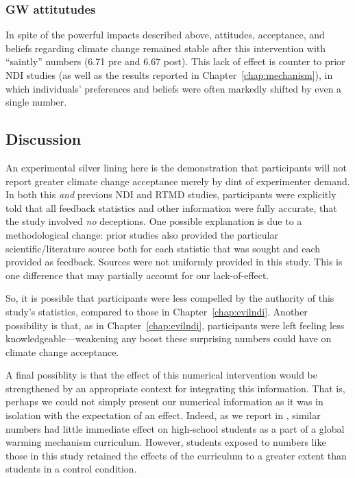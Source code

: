 \subsubsection{GW attitutudes}

In spite of the powerful impacts described above, attitudes, acceptance, and
beliefs regarding climate change remained stable after this intervention with
“saintly” numbers (6.71 pre and 6.67 post).  This lack of effect is counter to
prior NDI studies (as well as the results reported in
Chapter~\ref{chap:mechanism}), in which individuals’ preferences and beliefs
were often markedly shifted by even a single number. 

\subsection{Discussion}


An experimental silver lining here is the demonstration that participants will
not report greater climate change acceptance merely by dint of experimenter
demand.  In both this \emph{and} previous NDI and RTMD studies, participants
were explicitly told that all feedback statistics and other information were
fully accurate, that the study involved \emph{no} deceptions.  One possible
explanation is due to a methodological change: prior studies 
also provided the particular scientific/literature source both
for each statistic that was sought and each provided as feedback.
Sources were not uniformly provided in this study. This is one
difference that may partially account for our lack-of-effect.

So, it is possible that participants were less compelled by the authority of
this study’s statistics, compared to those in Chapter~\ref{chap:evilndi}.
Another possibility is that, as in Chapter~\ref{chap:evilndi}, participants were
left feeling less knowledgeable—weakening any boost these surprising numbers
could have on climate change acceptance.  

A final possiblity is that the effect of this numerical intervention would be
strengthened by an appropriate context for integrating this information. That
is, perhaps we could not simply present our numerical information as it was in
isolation with the expectation of an effect. Indeed, as we report in
\parencite{clark_knowledge_inpress}, similar numbers had little immediate effect on
high-school students as a part of a global warming mechanism curriculum.
However, students exposed to numbers like those in this study retained the
effects of the curriculum to a greater extent than students in a control
condition.

